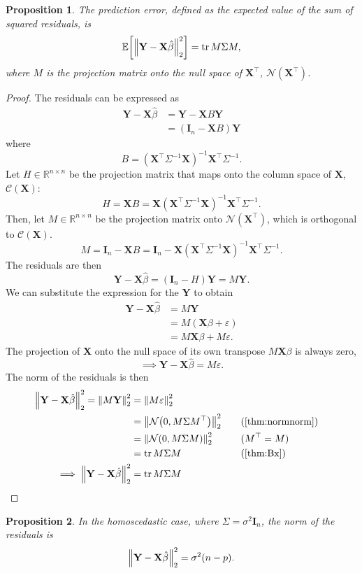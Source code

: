 \documentclass[letterpaper, reqno]{amsart}
\newtheorem{prop}{Proposition}[section]
\numberwithin{equation}{section}
\DeclarePairedDelimiter{\norm}{\lVert}{\rVert}
\newcommand{\T}{\top} %
\newcommand{\vect}[1]{\boldsymbol{\mathbf{#1}}} %
\newcommand{\E}[1]{\mathbb{E}\mleft[#1\mright]}
\newcommand{\R}{\mathbb{R}}  %
\newcommand{\N}[2]{\mathcal{N}\mleft( #1, #2 \mright)}
\newcommand{\by}[1]{&\quad&\text{(#1)}}
\newcommand{\Xm}{\vect{X}}
\newcommand{\Yv}{\vect{Y}}
\newcommand{\Bv}{\beta}
\newcommand{\Bvh}{\hat{\beta}}
\newcommand{\ve}{\varepsilon}
\DeclareMathOperator{\tr}{tr}
\begin{document}
\begin{prop}
  The prediction error, defined as the expected value of the sum of squared
  residuals, is
  \[ \E{\norm*{\Yv - \Xm\Bvh}_2^2} = \tr M \Sigma M, \]
  where $M$ is the projection matrix onto the null space of $\Xm^\T$,
  $\mathscr{N}(\Xm^\T)$.
\end{prop}

\begin{proof}
  The residuals can be expressed as
  \begin{align*}
    \Yv - \Xm\Bvh &= \Yv - \Xm B \Yv \\
    &= (\vect{I}_n - \Xm B) \Yv
  \end{align*}
  where
  \[ B = (\Xm^\T \Sigma^{-1} \Xm)^{-1} \Xm^\T \Sigma^{-1}. \]
  Let $H \in \R^{n \times n}$ be the projection matrix that maps onto the column
  space of $\Xm$, $\mathscr{C}(\Xm)$:
  \[ H = \Xm B =  \Xm (\Xm^\T \Sigma^{-1} \Xm)^{-1} \Xm^\T \Sigma^{-1}. \]
  Then, let $M \in \R^{n \times n}$ be the projection matrix onto
  $\mathscr{N}(\Xm^\T)$, which is orthogonal to $\mathscr{C}(\Xm)$.
  \[ M = \vect{I}_n - \Xm B 
        = \vect{I}_n - \Xm (\Xm^\T \Sigma^{-1} \Xm)^{-1} \Xm^\T \Sigma^{-1}. \]
  The residuals are then
  \[ \Yv - \Xm\Bvh = (\vect{I}_n - H)\Yv = M\Yv. \]
  We can substitute the expression for the $\Yv$ to obtain
  \begin{align*}
    \Yv - \Xm\Bvh &= M \Yv \\
    &= M (\Xm\Bv + \ve) \\
    &= M\Xm\Bv + M\ve.
  \end{align*}
  The projection of $\Xm$ onto the null space of its own transpose $M\Xm\Bv$ is
  always zero,
  \[ \implies \Yv - \Xm\Bvh = M\ve. \]
  The norm of the residuals is then
  \begin{alignat*}{3}
    \norm*{\Yv - \Xm\Bvh}_2^2 = \norm*{M\Yv}_2^2 &= \norm*{M\ve}_2^2 \\
    &= \norm*{\N{0}{M\Sigma M^\T}}_2^2 \by{\Cref{thm:normnorm}} \\
    &= \norm*{\N{0}{M\Sigma M}}_2^2 \by{$M^\T = M$} \\
    &= \tr M\Sigma M \by{\Cref{thm:Bx}} \\
    \implies \norm*{\Yv - \Xm\Bvh}_2^2 &= \tr M\Sigma M \tag*{\qedhere}
  \end{alignat*}
\end{proof}

\begin{prop}
  In the homoscedastic case, where $\Sigma = \sigma^2 \vect{I}_n$, the norm of
  the residuals is  
  \[ \norm*{\Yv - \Xm\Bvh}_2^2 = \sigma^2 (n - p). \]
\end{prop}
\end{document}
